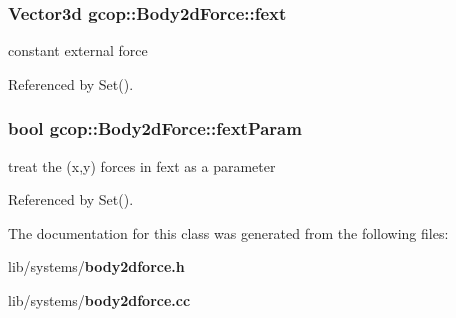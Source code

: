 \subsubsection[{fext}]{\setlength{\rightskip}{0pt plus 5cm}\-Vector3d {\bf gcop\-::\-Body2d\-Force\-::fext}}\label{classgcop_1_1Body2dForce_a7e24a55cc0450413b729a22abda0aeb4}


constant external force 



\-Referenced by \-Set().

\subsubsection[{fext\-Param}]{\setlength{\rightskip}{0pt plus 5cm}bool {\bf gcop\-::\-Body2d\-Force\-::fext\-Param}}\label{classgcop_1_1Body2dForce_aa081fcc538bbaef84d345a8136721721}


treat the (x,y) forces in fext as a parameter 



\-Referenced by \-Set().



\-The documentation for this class was generated from the following files\-:\begin{DoxyCompactItemize}
\item 
lib/systems/{\bf body2dforce.\-h}\item 
lib/systems/{\bf body2dforce.\-cc}\end{DoxyCompactItemize}
